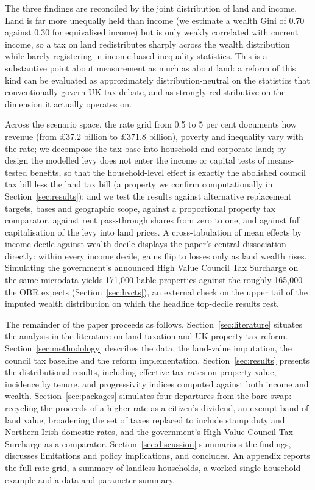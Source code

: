 The three findings are reconciled by the joint distribution of land and income. Land is far more unequally held than income (we estimate a wealth Gini of 0.70 against 0.30 for equivalised income) but is only weakly correlated with current income, so a tax on land redistributes sharply across the wealth distribution while barely registering in income-based inequality statistics. This is a substantive point about measurement as much as about land: a reform of this kind can be evaluated as approximately distribution-neutral on the statistics that conventionally govern UK tax debate, and as strongly redistributive on the dimension it actually operates on.

Across the scenario space, the rate grid from 0.5 to 5 per cent documents how revenue (from \pounds 37.2 billion to \pounds 371.8 billion), poverty and inequality vary with the rate; we decompose the tax base into household and corporate land; by design the modelled levy does not enter the income or capital tests of means-tested benefits, so that the household-level effect is exactly the abolished council tax bill less the land tax bill (a property we confirm computationally in Section~\ref{sec:results}); and we test the results against alternative replacement targets, bases and geographic scope, against a proportional property tax comparator, against rent pass-through shares from zero to one, and against full capitalisation of the levy into land prices. A cross-tabulation of mean effects by income decile against wealth decile displays the paper's central dissociation directly: within every income decile, gains flip to losses only as land wealth rises. Simulating the government's announced High Value Council Tax Surcharge on the same microdata yields 171{,}000 liable properties against the roughly 165{,}000 the OBR expects (Section~\ref{sec:hvcts}), an external check on the upper tail of the imputed wealth distribution on which the headline top-decile results rest.

The remainder of the paper proceeds as follows. Section~\ref{sec:literature} situates the analysis in the literature on land taxation and UK property-tax reform. Section~\ref{sec:methodology} describes the data, the land-value imputation, the council tax baseline and the reform implementation. Section~\ref{sec:results} presents the distributional results, including effective tax rates on property value, incidence by tenure, and progressivity indices computed against both income and wealth. Section~\ref{sec:packages} simulates four departures from the bare swap: recycling the proceeds of a higher rate as a citizen's dividend, an exempt band of land value, broadening the set of taxes replaced to include stamp duty and Northern Irish domestic rates, and the government's High Value Council Tax Surcharge as a comparator. Section~\ref{sec:discussion} summarises the findings, discusses limitations and policy implications, and concludes. An appendix reports the full rate grid, a summary of landless households, a worked single-household example and a data and parameter summary.
